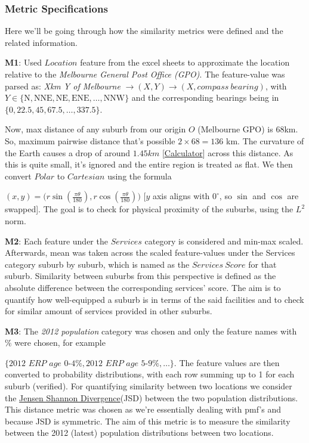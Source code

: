 \documentclass[
	a4paper, %
	10pt, %
	unnumberedsections, %
	twoside, %
]{LTJournalArticle}
\begin{document}
\subsubsection{Metric Specifications}\leavevmode


Here we'll be going through how the similarity metrics were defined and the related information.

\textbf{M1}: Used $Location$ feature from the excel sheets to approximate the location relative to the \textit{Melbourne General Post Office (GPO)}. The feature-value was parsed as: \newline
\textit{Xkm Y of Melbourne} $\rightarrow (X, Y) \rightarrow (X, compass\ bearing)$, with $Y \in \{\text{N}, \text{NNE}, \text{NE}, \text{ENE}, \dots,\text{NNW}\}$ and the corresponding bearings being in $\{0, 22.5, 45, 67.5,\dots, 337.5\}$.

Now, max distance of any suburb from our origin $O$ (Melbourne GPO) is 68km. So, maximum pairwise distance that's possible $2\times 68=136$ km. The curvature of the Earth causes a drop of around $1.45km$ [\href{https://earthcurvature.com/}{Calculator}] across this distance. As this is quite small, it's ignored and the entire region is treated as flat. We then convert $Polar$ to $Cartesian$ using the formula 

$(x, y) = \big(r\sin\left(\frac{\pi\theta}{180}\right), r\cos\left(\frac{\pi\theta}{180}\right)\big)$ [$y$ axis aligns with $0^\circ$, so $\sin$ and $\cos$ are swapped]. The goal is to check for physical proximity of the suburbs, using the $L^2$ norm.

\textbf{M2}: Each feature under the $Services$ category is considered and min-max scaled. Afterwards, mean was taken across the scaled feature-values under the Services category suburb by suburb, which is named as the $Services \ Score$ for that suburb. Similarity between suburbs from this perspective is defined as the absolute difference between the corresponding services' score. The aim is to quantify how well-equipped a suburb is in terms of the said facilities and to check for similar amount of services provided in other suburbs.

\textbf{M3}: The \textit{2012 population} category was chosen and only the feature names with $\%$ were chosen, for example

$\{ \textit{2012 ERP age 0-4\%}, \textit{2012 ERP age 5-9\%}, \dots\}$. The feature values are then converted to probability distributions, with each row summing up to 1 for each suburb (verified). For quantifying similarity between two locations we consider the \href{https://en.wikipedia.org/wiki/Jensen%E2%80%93Shannon_divergence}{Jensen Shannon Divergence}(JSD) between the two population distributions. This distance metric was chosen as we're essentially dealing with pmf's and because JSD is symmetric. The aim of this metric is to measure the similarity between the 2012 (latest) population distributions between two locations.
\end{document}
